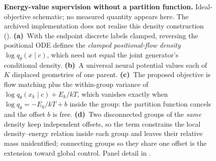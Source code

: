 \begin{figure}[t]
  \centering
  \providecommand{\figOneScale}{1.0}\renewcommand{\figOneScale}{1.000}%
  
  \caption{\textbf{Energy-value supervision without a partition function.}
    Ideal-objective schematic; no measured quantity appears here. The archived implementation does not realise this density construction ().
    \textbf{(a)}~With the endpoint discrete labels clamped, reversing the
    positional ODE defines the \emph{clamped positional-flow density}
    $\log q_\theta(x \mid c)$, which need not equal the joint generator's
    conditional density. \textbf{(b)}~A universal neural potential values each
    of $K$ displaced geometries of one parent. \textbf{(c)}~The proposed
    objective is flow matching plus the within-group variance of
    $\log q_\theta(x_k \mid c) + E_k/kT$, which vanishes exactly when
    $\log q_\theta = -E_k/kT + b$ inside the group: the partition function
    cancels and the offset $b$ is free. \textbf{(d)}~Two disconnected groups of
    the \emph{same} density keep independent offsets, so the term constrains
    the local density--energy relation inside each group and leaves their
    relative mass unidentified; connecting groups so they share one offset is
    the extension toward global control. Panel detail in .}
  \label{fig:objective}
\end{figure}
